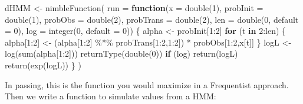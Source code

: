 \documentclass[
  12pt,
]{krantz}
\newenvironment{Shaded}{\begin{snugshade}}{\end{snugshade}}
\newcommand{\AttributeTok}[1]{\textcolor[rgb]{0.77,0.63,0.00}{#1}}
\newcommand{\ControlFlowTok}[1]{\textcolor[rgb]{0.13,0.29,0.53}{\textbf{#1}}}
\newcommand{\DecValTok}[1]{\textcolor[rgb]{0.00,0.00,0.81}{#1}}
\newcommand{\FunctionTok}[1]{\textcolor[rgb]{0.00,0.00,0.00}{#1}}
\newcommand{\NormalTok}[1]{#1}
\newcommand{\OtherTok}[1]{\textcolor[rgb]{0.56,0.35,0.01}{#1}}
\newcommand{\SpecialCharTok}[1]{\textcolor[rgb]{0.00,0.00,0.00}{#1}}
\begin{document}
\begin{Shaded}
\begin{Highlighting}[]
\NormalTok{dHMM }\OtherTok{\textless{}{-}} \FunctionTok{nimbleFunction}\NormalTok{(}
  \AttributeTok{run =} \ControlFlowTok{function}\NormalTok{(}\AttributeTok{x =} \FunctionTok{double}\NormalTok{(}\DecValTok{1}\NormalTok{), }
                 \AttributeTok{probInit =} \FunctionTok{double}\NormalTok{(}\DecValTok{1}\NormalTok{),}
                 \AttributeTok{probObs =} \FunctionTok{double}\NormalTok{(}\DecValTok{2}\NormalTok{),}
                 \AttributeTok{probTrans =} \FunctionTok{double}\NormalTok{(}\DecValTok{2}\NormalTok{),}
                 \AttributeTok{len =} \FunctionTok{double}\NormalTok{(}\DecValTok{0}\NormalTok{, }\AttributeTok{default =} \DecValTok{0}\NormalTok{),}
                 \AttributeTok{log =} \FunctionTok{integer}\NormalTok{(}\DecValTok{0}\NormalTok{, }\AttributeTok{default =} \DecValTok{0}\NormalTok{)) \{}
\NormalTok{    alpha }\OtherTok{\textless{}{-}}\NormalTok{ probInit[}\DecValTok{1}\SpecialCharTok{:}\DecValTok{2}\NormalTok{]}
    \ControlFlowTok{for}\NormalTok{ (t }\ControlFlowTok{in} \DecValTok{2}\SpecialCharTok{:}\NormalTok{len) \{}
\NormalTok{      alpha[}\DecValTok{1}\SpecialCharTok{:}\DecValTok{2}\NormalTok{] }\OtherTok{\textless{}{-}}\NormalTok{ (alpha[}\DecValTok{1}\SpecialCharTok{:}\DecValTok{2}\NormalTok{] }\SpecialCharTok{\%*\%}\NormalTok{ probTrans[}\DecValTok{1}\SpecialCharTok{:}\DecValTok{2}\NormalTok{,}\DecValTok{1}\SpecialCharTok{:}\DecValTok{2}\NormalTok{]) }\SpecialCharTok{*}\NormalTok{ probObs[}\DecValTok{1}\SpecialCharTok{:}\DecValTok{2}\NormalTok{,x[t]]}
\NormalTok{    \}}
\NormalTok{    logL }\OtherTok{\textless{}{-}} \FunctionTok{log}\NormalTok{(}\FunctionTok{sum}\NormalTok{(alpha[}\DecValTok{1}\SpecialCharTok{:}\DecValTok{2}\NormalTok{]))}
    \FunctionTok{returnType}\NormalTok{(}\FunctionTok{double}\NormalTok{(}\DecValTok{0}\NormalTok{))}
    \ControlFlowTok{if}\NormalTok{ (log) }\FunctionTok{return}\NormalTok{(logL)}
    \FunctionTok{return}\NormalTok{(}\FunctionTok{exp}\NormalTok{(logL))}
\NormalTok{  \}}
\NormalTok{)}
\end{Highlighting}
\end{Shaded}

In passing, this is the function you would maximize in a Frequentist approach. Then we write a function to simulate values from a HMM:
\end{document}
